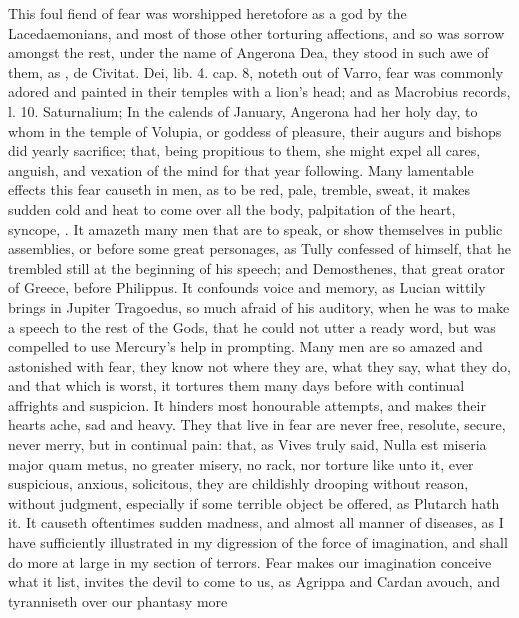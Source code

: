 {This foul fiend of fear was worshipped heretofore as a god by the
Lacedaemonians, and most of those other torturing affections, and
so was sorrow amongst the rest, under the name of Angerona Dea, they
stood in such awe of them, as \Austin{}, de Civitat. Dei, lib. 4. cap. 8,
noteth out of Varro, fear was commonly adored and painted in
their temples with a lion's head; and as Macrobius records, l. 10.
Saturnalium; In the calends of January, Angerona had her holy
day, to whom in the temple of Volupia, or goddess of pleasure, their
augurs and bishops did yearly sacrifice; that, being propitious to
them, she might expel all cares, anguish, and vexation of the mind for
that year following. Many lamentable effects this fear causeth in men,
as to be red, pale, tremble, sweat, it makes sudden cold and heat
to come over all the body, palpitation of the heart, syncope, \etc{}. It
amazeth many men that are to speak, or show themselves in public
assemblies, or before some great personages, as Tully confessed of
himself, that he trembled still at the beginning of his speech; and
Demosthenes, that great orator of Greece, before Philippus. It
confounds voice and memory, as Lucian wittily brings in Jupiter
Tragoedus, so much afraid of his auditory, when he was to make a speech
to the rest of the Gods, that he could not utter a ready word, but was
compelled to use Mercury's help in prompting. Many men are so amazed
and astonished with fear, they know not where they are, what they say,
what they do, and that which is worst, it tortures them many days
before with continual affrights and suspicion. It hinders most
honourable attempts, and makes their hearts ache, sad and heavy. They
that live in fear are never free, resolute, secure, never merry,
but in continual pain: that, as Vives truly said, Nulla est miseria
major quam metus, no greater misery, no rack, nor torture like unto it,
ever suspicious, anxious, solicitous, they are childishly drooping
without reason, without judgment, especially if some terrible
object be offered, as Plutarch hath it. It causeth oftentimes sudden
madness, and almost all manner of diseases, as I have sufficiently
illustrated in my  digression of the force of imagination, and
shall do more at large in my section of terrors. Fear makes our
imagination conceive what it list, invites the devil to come to us, as
Agrippa and Cardan avouch, and tyranniseth over our phantasy more
}
